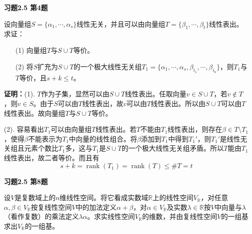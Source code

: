 
\renewcommand{\newpageorvspace}{\vspace{2em}}

\date{2021-10-15  第二次习题课}



\maketitle

{\bf 习题2.5 第4题}

设向量组$S = \{ \alpha_1, \cdots, \alpha_s \}$线性无关，并且可以由向量组$T = \{ \beta_1, \cdots, \beta_t \}$线性表出。求证：
\begin{itemize}
\item[(1)] 向量组$T$与$S\cup T$等价。
\item[(2)] 将$S$扩充为$S\cup T$的一个极大线性无关组$T_1 = \{ \alpha_1, \cdots, \alpha_s, \beta_{i_1}, \cdots, \beta_{i_k} \}$，则$T_1$与$T$等价，且$s+k\leqslant t$。
\end{itemize}

{\bf 证明：}(1). $T$作为子集，显然可以由$S\cup T$线性表出。任取向量$v\in S\cup T$，若$v\not\in T$，则$v\in S$。由于$S$可以由$T$线性表出，故$v$可以由$T$线性表出。所以由$S\cup T$可以由$T$线性表出。故向量组$T$与$S\cup T$等价。

(2). 容易看出$T_1$可以由向量组$T$线性表出。若$T$不能由$T_1$线性表出，则存在$\beta \in T\setminus T_1$，使得$\beta$不能表示为$T_1$中向量的线性组合。将$\beta$添加到$T_1$中得到$T_1'$，则$T_1'$是线性无关组且元素个数比$T_1$多，这与$T_1$是$S\cup T$的一个极大线性无关组矛盾。所以$T$能由$T_1$线性表出，故二者等价。而且有
$$s+k = \operatorname{rank}(T_1) = \operatorname{rank}(T) \leqslant \# T = t$$

\newpageorvspace

{\bf 习题2.5 第8题}

设$V$是复数域上的$n$维线性空间。将它看成实数域$\mathbb{R}$上的线性空间$V_{\mathbb{R}}$，对任意$\alpha,\beta\in V_{\mathbb{R}}$按复线性空间$V$中的加法定义$\alpha+\beta$，对$\alpha\in V_{\mathbb{R}}$及实数$\lambda\in\mathbb{R}$按$V$中向量与$\lambda$（看作复数）的乘法定义$\lambda\alpha$。求实线性空间$V_{\mathbb{R}}$的维数，并由复线性空间$V$的一组基求出$V_{\mathbb{R}}$的一组基。

